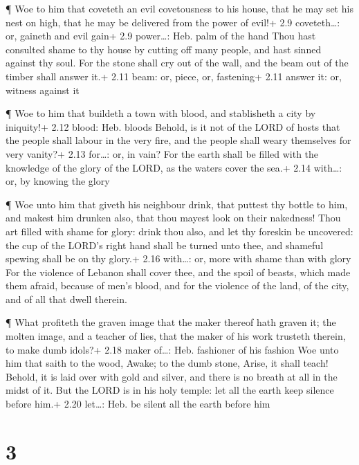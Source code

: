  ¶ Woe to him that coveteth an evil covetousness to his
house, that he may set his nest on high, that he may be delivered from
the power of evil!+ 2.9 coveteth\ldots: or, gaineth and evil gain+ 2.9
power\ldots: Heb. palm of the hand  Thou hast consulted
shame to thy house by cutting off many people, and hast sinned against
thy soul.  For the stone shall cry out of the wall, and the
beam out of the timber shall answer it.+ 2.11 beam: or, piece, or,
fastening+ 2.11 answer it: or, witness against it

 ¶ Woe to him that buildeth a town with blood, and
stablisheth a city by iniquity!+ 2.12 blood: Heb. bloods 
Behold, is it not of the LORD of hosts that the people shall labour in
the very fire, and the people shall weary themselves for very vanity?+
2.13 for\ldots: or, in vain?  For the earth shall be filled
with the knowledge of the glory of the LORD, as the waters cover the
sea.+ 2.14 with\ldots: or, by knowing the glory

 ¶ Woe unto him that giveth his neighbour drink, that
puttest thy bottle to him, and makest him drunken also, that thou mayest
look on their nakedness!  Thou art filled with shame for
glory: drink thou also, and let thy foreskin be uncovered: the cup of
the LORD's right hand shall be turned unto thee, and shameful spewing
shall be on thy glory.+ 2.16 with\ldots: or, more with shame than with
glory  For the violence of Lebanon shall cover thee, and
the spoil of beasts, which made them afraid, because of men's blood, and
for the violence of the land, of the city, and of all that dwell
therein.

 ¶ What profiteth the graven image that the maker thereof
hath graven it; the molten image, and a teacher of lies, that the maker
of his work trusteth therein, to make dumb idols?+ 2.18 maker of\ldots:
Heb. fashioner of his fashion  Woe unto him that saith to
the wood, Awake; to the dumb stone, Arise, it shall teach! Behold, it is
laid over with gold and silver, and there is no breath at all in the
midst of it.  But the LORD is in his holy temple: let all
the earth keep silence before him.+ 2.20 let\ldots: Heb. be silent all
the earth before him

\hypertarget{section-2}{%
\section{3}\label{section-2}}

